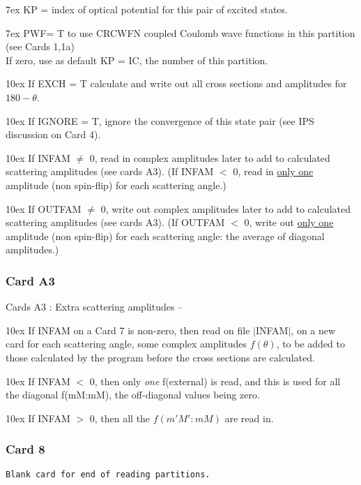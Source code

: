 \documentclass[11pt]{article}
\begin{document}
\hangindent 7ex
KP = index of optical potential for this pair of excited states.

\hangindent 7ex
PWF= T to use CRCWFN  coupled Coulomb wave functions in this
partition (see Cards 1,1a)
\\
If zero, use as default KP = IC, the number of this partition.

\hangindent 10ex
If EXCH = T calculate and write out all cross sections and amplitudes
for $180-\theta$.


\hangindent 10ex
If IGNORE = T, ignore the convergence of this  state pair
(see IPS discussion on Card 4).

\hangindent 10ex
If INFAM $\ne$ 0,  read in complex amplitudes later to add to
calculated scattering amplitudes (see cards A3).
(If INFAM $<$ 0, read in \underline{only one} amplitude (non spin-flip)
for each scattering angle.)

\hangindent 10ex
If OUTFAM $\ne$ 0,  write out complex amplitudes later to add to
calculated scattering amplitudes (see cards A3).
(If OUTFAM $<$ 0, write out \underline{only one} amplitude (non spin-flip)
for each scattering angle: the average of diagonal amplitudes.)

%
\subsubsection*{Card A3}

Cards A3 :  Extra scattering amplitudes --
\bigskip

\hangindent 10ex
If INFAM on a Card 7 is non-zero, then read on file $|$INFAM$|$, on a new card
for each scattering angle, some complex amplitudes $f(\theta)$,
to be added to those calculated by the program before the cross
sections are calculated.


\hangindent 10ex
If INFAM $<$ 0, then only
{\em one} f(external) is read, and this is used for all the diagonal
f(mM:mM), the off-diagonal values being zero.

\hangindent 10ex
If INFAM $>$ 0, then all the $f(m'M':mM)$ are read in.
%
\subsubsection*{Card 8}
\begin{verbatim}
Blank card for end of reading partitions.
\end{verbatim}
\newpage
\end{document}

